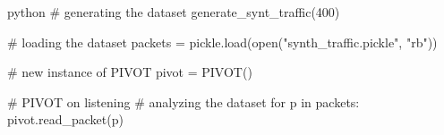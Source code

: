\begin{mintedbox}{python}
# generating the dataset
generate_synt_traffic(400)

# loading the dataset
packets =  pickle.load(open("synth_traffic.pickle", "rb"))

# new instance of PIVOT
pivot = PIVOT()

# PIVOT on listening
# analyzing the dataset
for p in packets:
    pivot.read_packet(p)
\end{mintedbox}
